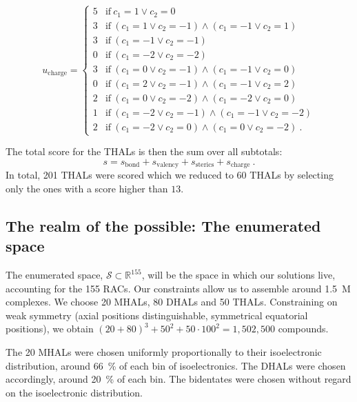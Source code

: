 \documentclass[]{article}
\begin{document}
\begin{equation}
u_{\textrm{charge}} = 
\begin{cases}
5	&	\mathrm{if}~ c_1 = 1 \vee c_2 = 0 \\
3	&	\mathrm{if}~ (c_1 = 1 \vee c_2 = -1) \wedge (c_1 = -1 \vee c_2 = 1) \\
3   &	\mathrm{if}~ (c_1 = -1 \vee c_2 = -1) \\
0   &	\mathrm{if}~ (c_1 = -2 \vee c_2 = -2) \\
3   &	\mathrm{if}~ (c_1 = 0 \vee c_2 = -1) \wedge (c_1 = -1 \vee c_2 = 0) \\
0   &	\mathrm{if}~ (c_1 = 2 \vee c_2 = -1) \wedge (c_1 = -1 \vee c_2 = 2) \\
2   &	\mathrm{if}~ (c_1 = 0 \vee c_2 = -2) \wedge (c_1 = -2 \vee c_2 = 0) \\
1   &	\mathrm{if}~ (c_1 = -2 \vee c_2 = -1) \wedge (c_1 = -1 \vee c_2 = -2) \\
2   &	\mathrm{if}~ (c_1 = -2 \vee c_2 = 0) \wedge (c_1 = 0 \vee c_2 = -2) ~.
\end{cases}
\end{equation}

The total score for the THALs is then the sum over all subtotals:
\begin{equation}
	s =  s_{\textrm{bond}}  + s_{\textrm{valency}} + s_{\textrm{sterics}} + s_{\textrm{charge}} ~.
\end{equation}
In total, 201 THALs were scored which we reduced to 60 THALs by selecting only the ones with a score higher than $13$.

\subsection{The realm of the possible: The enumerated space}
The enumerated space, $\mathcal{S} \subset \mathbb{R}^{155}$, will be the space in which our solutions live, accounting for the 155 RACs. Our constraints allow us to assemble around 1.5~M complexes. We choose 20 MHALs, 80 DHALs and 50 THALs. Constraining on weak symmetry (axial positions distinguishable, symmetrical equatorial positions), we obtain $(20 + 80)^3 + 50^2 + 50 \cdot 100^2 = 1,502,500$ compounds. 

The 20 MHALs were chosen uniformly proportionally to their isoelectronic distribution, around 66~\% of each bin of isoelectronics. The DHALs were chosen accordingly, around 20~\% of each bin. The bidentates were chosen without regard on the isoelectronic distribution. 
\end{document}

